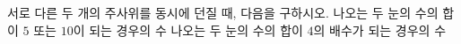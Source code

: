 서로 다른 두 개의 주사위를 동시에 던질 때, 다음을 구하시오.
 나오는 두 눈의 수의 합이 $5$ 또는 $10$이 되는 경우의 수
 나오는 두 눈의 수의 합이 $4$의 배수가 되는 경우의 수
